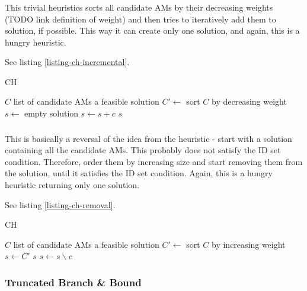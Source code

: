 \subsubsection{}

This trivial heuristics sorts all candidate AMs by their decreasing weights (TODO link definition of weight) and then tries to iteratively add them to solution, if possible. This way it can create only one solution, and again, this is a hungry heuristic.

See listing \ref{listing-ch-incremental}.

\begin{algorithm}
\caption{ CH}
\label{listing-ch-incremental}
\begin{algorithmic}
\REQUIRE $C$ list of candidate AMs
\ENSURE a feasible solution
\STATE $C' \gets $ sort $C$ by decreasing weight
\STATE $s \gets $ empty solution
    \STATE $s \gets s + c$
  \ENDIF
\ENDFOR
\RETURN $s$
\end{algorithmic}
\end{algorithm}

\subsubsection{}

This is basically a reversal of the idea from the  heuristic - start with a solution containing all the candidate AMs. This probably does not satisfy the ID set condition. Therefore, order them by increasing size and start removing them from the solution, until it satisfies the ID set condition. Again, this is a hungry heuristic returning only one solution.

See listing \ref{listing-ch-removal}.

\begin{algorithm}
\caption{ CH}
\label{listing-ch-removal}
\begin{algorithmic}
\REQUIRE $C$ list of candidate AMs
\ENSURE a feasible solution
\STATE $C' \gets $ sort $C$ by increasing weight
\STATE $s \gets C'$
    \RETURN $s$
  \ENDIF
  \STATE $s \gets s \backslash c$
\ENDFOR
\end{algorithmic}
\end{algorithm}

\subsubsection{Truncated Branch \& Bound}

